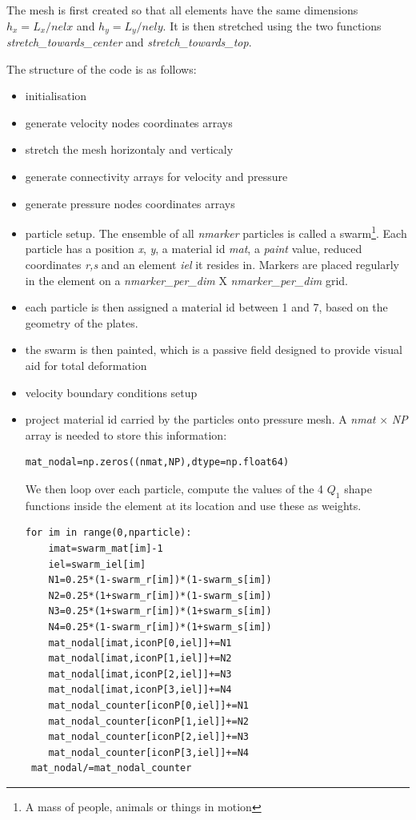The mesh is first created so that all elements have the same dimensions $h_x=L_x/nelx$ and $h_y=L_y/nely$.
It is then stretched using the two functions {\sl stretch\_towards\_center} and 
{\sl stretch\_towards\_top}.

The structure of the code is as follows:
\begin{itemize}
\item initialisation
\item generate velocity nodes coordinates arrays
\item stretch the mesh horizontaly and verticaly
\item generate connectivity arrays for velocity and pressure 
\item generate pressure nodes coordinates arrays
\item particle setup. The ensemble of all {\sl nmarker} particles is called a swarm\footnote{A mass of people, animals or things in motion}. Each particle has a position {\sl x}, {\sl y}, a material id {\sl mat}, a {\sl paint} value, reduced coordinates {\sl r,s} and an element {\sl iel} it resides in. Markers are placed regularly in the element on a {\sl nmarker\_per\_dim} X {\sl nmarker\_per\_dim} grid. 
\item each particle is then assigned a material id between 1 and 7, based on the geometry of the plates.
\item the swarm is then painted, which is a passive field designed to provide visual aid for total deformation 
\item velocity boundary conditions setup
\item project material id carried by the particles onto pressure mesh. A {\sl nmat} $\times$ {\sl NP} 
array is needed to store this information:
\begin{lstlisting}
mat_nodal=np.zeros((nmat,NP),dtype=np.float64)
\end{lstlisting}
We then loop over each particle, compute the values of the 4 $Q_1$ shape functions inside the element at its location and use these as weights. 
\begin{lstlisting}
for im in range(0,nparticle):
    imat=swarm_mat[im]-1
    iel=swarm_iel[im]
    N1=0.25*(1-swarm_r[im])*(1-swarm_s[im])
    N2=0.25*(1+swarm_r[im])*(1-swarm_s[im])
    N3=0.25*(1+swarm_r[im])*(1+swarm_s[im])
    N4=0.25*(1-swarm_r[im])*(1+swarm_s[im])
    mat_nodal[imat,iconP[0,iel]]+=N1
    mat_nodal[imat,iconP[1,iel]]+=N2
    mat_nodal[imat,iconP[2,iel]]+=N3
    mat_nodal[imat,iconP[3,iel]]+=N4
    mat_nodal_counter[iconP[0,iel]]+=N1
    mat_nodal_counter[iconP[1,iel]]+=N2
    mat_nodal_counter[iconP[2,iel]]+=N3
    mat_nodal_counter[iconP[3,iel]]+=N4
 mat_nodal/=mat_nodal_counter
\end{lstlisting}


\end{itemize}
